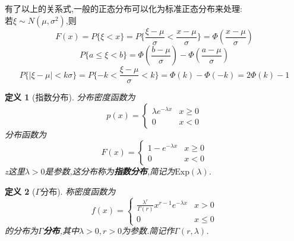 \documentclass[12pt,a4paper]{article}
\newtheorem{definition}{定义}[subsection] %
\begin{document}
有了以上的关系式,一般的正态分布可以化为标准正态分布来处理:\\若$\xi \sim N(\mu, \sigma^2)$,则
\[F(x)=P\{\xi<x\} = P\{\frac{\xi-\mu}{\sigma}<\frac{x-\mu}{\sigma}\}=\varPhi(\frac{x-\mu}{\sigma})\]
\[P\{a\leq\xi<b\}=\varPhi(\frac{b-\mu}{\sigma})-\varPhi(\frac{a-\mu}{\sigma})\]
\[P\{|\xi-\mu|<k\sigma\} = P\{-k<\frac{\xi-\mu}{\sigma}<k\}=\varPhi(k)-\varPhi(-k)=2\varPhi(k)-1\]
\begin{definition}[指数分布]
    分布密度函数为
    \[p(x)=
    \begin{cases}\lambda e^{-\lambda x}& x\geq0\\
    0 &x<0\end{cases}\]
    分布函数为\[F(x)=\begin{cases}1-e^{-\lambda x}&x\geq 0\\0&x<0\end{cases}\]
    z这里$\lambda>0$是参数,这分布称为\textbf{指数分布},简记为$\mathrm{Exp}(\lambda)$.
\end{definition}
\begin{definition}[$\Gamma$分布]
    称密度函数为\[f(x)=\begin{cases}\frac{\lambda^r}{\Gamma(r)}x^{r-1}e^{-\lambda x}&x>0\\0& x\leq0\end{cases}\]
    的分布为\textbf{$\Gamma$分布},其中$\lambda>0,r>0$为参数.简记作$\Gamma(r,\lambda)$.
\end{definition}
\end{document}
